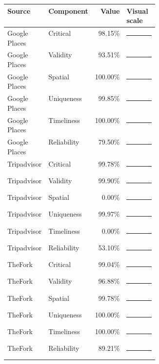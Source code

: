 {\scriptsize
\begin{tabular}{llrp{0.36\linewidth}}
\toprule
Source & Component & Value & Visual scale \\
\midrule
Google Places & Critical & 98.15\% & \textcolor{qualitygreen}{\rule{47.1mm}{5pt}} \\
Google Places & Validity & 93.51\% & \textcolor{qualityblue}{\rule{44.9mm}{5pt}} \\
Google Places & Spatial & 100.00\% & \textcolor{qualitygreen}{\rule{48.0mm}{5pt}} \\
Google Places & Uniqueness & 99.85\% & \textcolor{qualitygreen}{\rule{47.9mm}{5pt}} \\
Google Places & Timeliness & 100.00\% & \textcolor{qualitygreen}{\rule{48.0mm}{5pt}} \\
Google Places & Reliability & 79.50\% & \textcolor{qualityorange}{\rule{38.2mm}{5pt}} \\
Tripadvisor & Critical & 99.78\% & \textcolor{qualitygreen}{\rule{47.9mm}{5pt}} \\
Tripadvisor & Validity & 99.90\% & \textcolor{qualitygreen}{\rule{48.0mm}{5pt}} \\
Tripadvisor & Spatial & 0.00\% & \textcolor{qualityred}{\rule{0.6mm}{5pt}} \\
Tripadvisor & Uniqueness & 99.97\% & \textcolor{qualitygreen}{\rule{48.0mm}{5pt}} \\
Tripadvisor & Timeliness & 0.00\% & \textcolor{qualityred}{\rule{0.6mm}{5pt}} \\
Tripadvisor & Reliability & 53.10\% & \textcolor{qualityorange}{\rule{25.5mm}{5pt}} \\
TheFork & Critical & 99.04\% & \textcolor{qualitygreen}{\rule{47.5mm}{5pt}} \\
TheFork & Validity & 96.88\% & \textcolor{qualitygreen}{\rule{46.5mm}{5pt}} \\
TheFork & Spatial & 99.78\% & \textcolor{qualitygreen}{\rule{47.9mm}{5pt}} \\
TheFork & Uniqueness & 100.00\% & \textcolor{qualitygreen}{\rule{48.0mm}{5pt}} \\
TheFork & Timeliness & 100.00\% & \textcolor{qualitygreen}{\rule{48.0mm}{5pt}} \\
TheFork & Reliability & 89.21\% & \textcolor{qualityblue}{\rule{42.8mm}{5pt}} \\
\bottomrule
\end{tabular}
}
